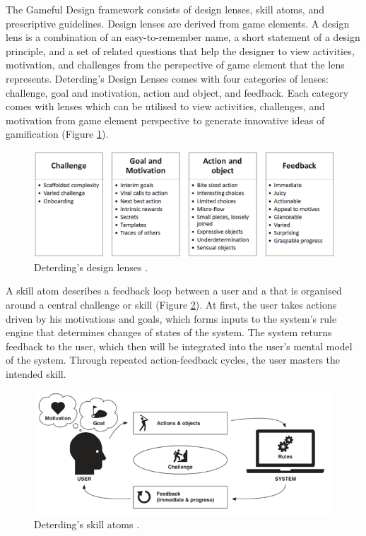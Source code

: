 \documentclass[12pt, a4paper]{report}
\begin{document}
The Gameful Design framework consists of design lenses, skill atoms, and prescriptive guidelines. Design lenses are derived from game elements. A design lens is a combination of an easy-to-remember name, a short statement of a design principle, and a set of related questions that help the designer to view activities, motivation, and challenges from the perspective of game element that the lens represents. Deterding's Design Lenses comes with four categories of lenses: challenge, goal and motivation, action and object, and feedback. Each category comes with lenses which can be utilised to view activities, challenges, and motivation from game element perspective to generate innovative ideas of gamification (Figure \ref{lenses}). 

\begin{figure}[ht]
\centering
\includegraphics[width=12cm]{lenses}
\caption{Deterding's design lenses \cite{deterding2015lens}.}
\label{lenses}
\end{figure}


A skill atom describes a feedback loop between a user and a that is organised around a central challenge or skill (Figure \ref{skill-atoms}). At first, the user takes actions driven by his motivations and goals, which forms inputs to the system's rule engine that determines changes of states of the system. The system returns feedback to the user, which then will be integrated into the user's mental model of the system. Through repeated action-feedback cycles, the user masters the intended skill.

\begin{figure}[ht]
\centering
\includegraphics[width=12cm]{skill-atoms}
\caption{Deterding's skill atoms \cite{deterding2015lens}.}
\label{skill-atoms}
\end{figure}
\end{document}
